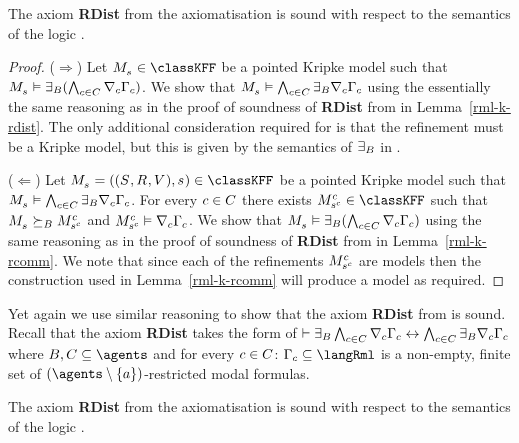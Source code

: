 \begin{lemma}\label{rml-k45-rdist}
The axiom {\bf RDist} from the axiomatisation \axiomRmlKFF{} is sound with respect to the semantics of the logic \logicRmlKFF{}.
\end{lemma}

\begin{proof}
($\Rightarrow$) Let $\kPModel{\kStateS} \in \classKFF$ be a pointed Kripke model such that $\kPModel{\kStateS} \entails \somerefsBs ( \bigwedge_{\agentC \in \agentsC} \coversC \Gamma_\agentC )$.
We show that $\kPModel{\kStateS} \entails \bigwedge_{\agentC \in \agentsC} \somerefsBs \coversC \Gamma_\agentC$ using the essentially the same reasoning as in the proof of soundness of {\bf RDist} from \axiomRmlK{} in Lemma~\ref{rml-k-rdist}.
The only additional consideration required for \logicRmlKFF{} is that the refinement must be a \classKFF{} Kripke model, but this is given by the semantics of $\somerefsBs$ in \logicRmlKFF{}.

($\Leftarrow$) Let $\kPModelAndTuple{\kStateS} \in \classKFF$ be a pointed Kripke model such that $\kPModel{\kStateS} \entails \bigwedge_{\agentC \in \agentsC} \somerefsBs \coversC \Gamma_\agentC$.
For every $\agentC \in \agentsC$ there exists $\kPModel[\agentC]{\kStateS[\agentC]} \in \classKFF$ such that $\kPModel{\kStateS} \simulatesBs \kPModel[\agentC]{\kStateS[\agentC]}$ and $\kPModel[\agentC]{\kStateS[\agentC]} \entails \coversC \Gamma_\agentC$.
We show that $\kPModel{\kStateS} \entails \somerefsBs ( \bigwedge_{\agentC \in \agentsC} \coversC \Gamma_\agentC)$ using the same reasoning as in the proof of soundness of {\bf RDist} from \axiomRmlK{} in Lemma~\ref{rml-k-rcomm}.
We note that since each of the refinements $\kPModel[\agentC]{\kStateS[\agentC]}$ are \classKFF{} models then the construction used in Lemma~\ref{rml-k-rcomm} will produce a \classKFF{} model as required.
\end{proof}

Yet again we use similar reasoning to show that the axiom {\bf RDist} from \axiomRmlKD{} is sound.
Recall that the axiom {\bf RDist} takes the form of $\proves \somerefsBs \bigwedge_{\agentC \in \agentsC} \coversC \Gamma_\agentC \iff \bigwedge_{\agentC \in \agentsC} \somerefsBs \coversC \Gamma_\agentC$ where $\agentsB, \agentsC \subseteq \agents$ and for every $\agentC \in \agentsC$: $\Gamma_\agentC \subseteq \langRml$ is a non-empty, finite set of $(\agents \setminus \{\agentA\})$-restricted modal formulas.

\begin{lemma}\label{rml-kd45-rdist}
The axiom {\bf RDist} from the axiomatisation \axiomRmlKFF{} is sound with respect to the semantics of the logic \logicRmlKFF{}.
\end{lemma}

